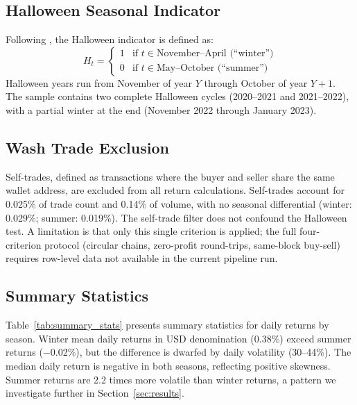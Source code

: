 \documentclass[12pt,a4paper]{article}
\begin{document}
\subsection{Halloween Seasonal Indicator}

Following \citet{BoumanJacobsen2002}, the Halloween indicator is defined as:
\begin{equation}\label{eq:halloween}
H_t = \begin{cases} 1 & \text{if } t \in \text{November--April (``winter'')} \\ 0 & \text{if } t \in \text{May--October (``summer'')} \end{cases}
\end{equation}
Halloween years run from November of year $Y$ through October of year $Y+1$. The sample contains two complete Halloween cycles (2020--2021 and 2021--2022), with a partial winter at the end (November 2022 through January 2023).

\subsection{Wash Trade Exclusion}

Self-trades, defined as transactions where the buyer and seller share the same wallet address, are excluded from all return calculations. Self-trades account for 0.025\% of trade count and 0.14\% of volume, with no seasonal differential (winter: 0.029\%; summer: 0.019\%). The self-trade filter does not confound the Halloween test. A limitation is that only this single criterion is applied; the full four-criterion protocol (circular chains, zero-profit round-trips, same-block buy-sell) requires row-level data not available in the current pipeline run.

\subsection{Summary Statistics}

Table~\ref{tab:summary_stats} presents summary statistics for daily returns by season. Winter mean daily returns in USD denomination (0.38\%) exceed summer returns ($-$0.02\%), but the difference is dwarfed by daily volatility (30--44\%). The median daily return is negative in both seasons, reflecting positive skewness. Summer returns are 2.2 times more volatile than winter returns, a pattern we investigate further in Section~\ref{sec:results}.
\end{document}
